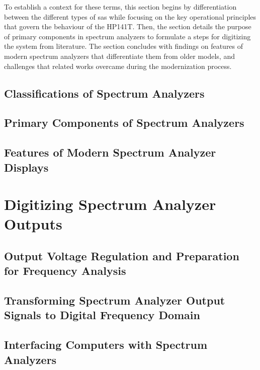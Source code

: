 \documentclass[class=report,11pt,crop=false]{standalone}
\begin{document}
To establish a context for these terms, this section begins by differentiation between the different types of \acrshort{sa}s while focusing on the key operational principles that govern the behaviour of the HP141T. Then, the section details the purpose of primary components in spectrum analyzers to formulate a steps for digitizing the system from literature. The section concludes with findings on features of modern spectrum analyzers that differentiate them from older models, and challenges that related works overcame during the modernization process.  

\subsection{Classifications of Spectrum Analyzers}

\subsection{Primary Components of Spectrum Analyzers}

\subsection{Features of Modern Spectrum Analyzer Displays}

\section{Digitizing Spectrum Analyzer Outputs}

\subsection{Output Voltage Regulation and Preparation for Frequency Analysis}

\subsection{Transforming Spectrum Analyzer Output Signals to Digital Frequency Domain}

\subsection{Interfacing Computers with Spectrum Analyzers}

\ifstandalone

\printnoidxglossary[type=\acronymtype,nonumberlist]
\fi
\end{document}
